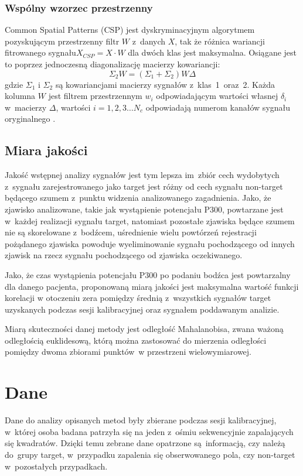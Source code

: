 \documentclass[licencjacka,openright]{pracamgr}
\begin{document}
\subsection{Wspólny wzorzec przestrzenny}
Common Spatial Patterns (CSP) jest dyskryminacyjnym algorytmem pozyskującym przestrzenny filtr $W$ z~danych $X$, tak że różnica wariancji fitrowanego sygnału\mbox{$X_{CSP} = X \cdot W$} dla dwóch klas jest maksymalna. Osiągane jest to poprzez jednoczesną diagonalizację macierzy kowariancji:
\begin{equation}
\Sigma _2 W = (\Sigma _1 + \Sigma _2 )W \Delta
\end{equation}
gdzie $\Sigma_1$ i $\Sigma_2$ są kowariancjami macierzy sygnałów z~klas~1~oraz~2. Każda kolumna $W$ jest filtrem przestrzennym $w_i$ odpowiadającym wartości własnej $\delta _i$ w~macierzy $\Delta$, wartości $i = 1,2,3 \ldots N_c$ odpowiadają numerom kanałów sygnału oryginalnego \citep{sannelli2011}.

\section{Miara jakości}
Jakość wstępnej analizy sygnałów jest tym lepsza im~zbiór cech wydobytych z~sygnału zarejestrowanego jako target jest różny od cech sygnału non-target będącego szumem z~punktu widzenia analizowanego zagadnienia. Jako, że zjawisko analizowane, takie jak wystąpienie potencjału P300, powtarzane jest w~każdej realizacji sygnału target, natomiast pozostałe zjawiska będące szumem nie są skorelowane z~bodźcem, uśrednienie wielu powtórzeń rejestracji pożądanego zjawiska powoduje wyeliminowanie sygnału pochodzącego od innych zjawisk na rzecz sygnału pochodzącego od zjawiska oczekiwanego.

Jako, że czas wystąpienia potencjału P300 po podaniu bodźca jest powtarzalny dla danego pacjenta, proponowaną miarą jakości jest maksymalna wartość funkcji korelacji w otoczeniu zera pomiędzy średnią z~wszystkich sygnałów target uzyskanych podczas sesji kalibracyjnej oraz sygnałem poddawanym analizie.

Miarą skuteczności danej metody jest odległość Mahalanobisa, zwana ważoną odległością euklidesową, którą można zastosować do mierzenia odległości pomiędzy dwoma zbiorami punktów~w przestrzeni wielowymiarowej.

\chapter{Dane}
Dane do analizy opisanych metod były zbierane podczas sesji kalibracyjnej, w~której osoba badana patrzyła się na jeden z~ośmiu sekwencyjnie zapalających się kwadratów. Dzięki temu zebrane dane opatrzone są~informacją, czy należą do~grupy target, w~przypadku zapalenia się obserwowanego pola, czy non-target w~pozostałych przypadkach.
\end{document}
